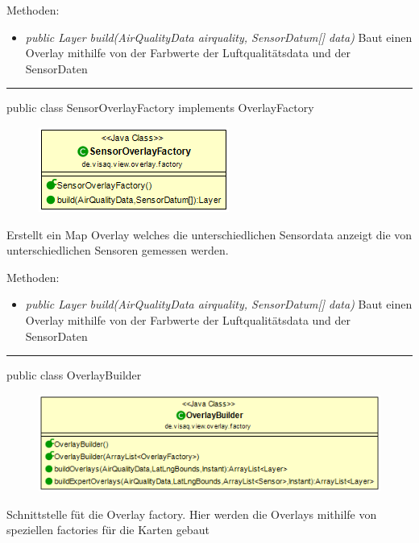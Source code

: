 Methoden:
\begin{itemize} 
    \item \emph{public Layer build(AirQualityData airquality, SensorDatum[] data)}  Baut einen Overlay mithilfe von der Farbwerte der Luftqualitätsdata und der SensorDaten
\end{itemize}

\rule{\textwidth}{0.4pt} 
public class SensorOverlayFactory implements OverlayFactory

\begin{minipage}{0.3\textwidth}
    \begin{figure}[H]
        \includegraphics[scale = 0.5]{media/frontend/view/de.view.overlay.factory/SensorOverlayFactory_Class.png}
    \end{figure}
    \end{minipage} \hfill
    \begin{minipage}{0.6\textwidth}
        Erstellt ein Map Overlay welches die unterschiedlichen Sensordata anzeigt die von unterschiedlichen Sensoren gemessen werden.
\end{minipage}

Methoden:
\begin{itemize} 
    \item \emph{public Layer build(AirQualityData airquality, SensorDatum[] data)}  Baut einen Overlay mithilfe von der Farbwerte der Luftqualitätsdata und der SensorDaten
\end{itemize}

\rule{\textwidth}{0.4pt} 
public class OverlayBuilder

\begin{minipage}{0.5\textwidth}
    \begin{figure}[H]
        \includegraphics[scale = 0.5]{media/frontend/view/de.view.overlay.factory/OverlayBuilder_Class.png}
    \end{figure}
    \end{minipage} \hfill
    \begin{minipage}{0.4\textwidth}
Schnittstelle füt die Overlay factory. Hier werden die Overlays mithilfe von speziellen factories für die Karten gebaut
\end{minipage}

